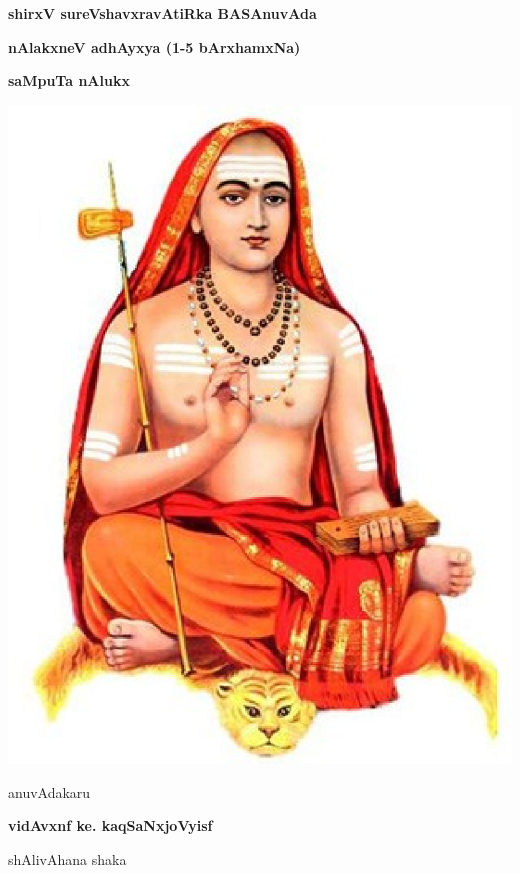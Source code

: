 \thispagestyle{empty}
\begin{center}
{\Huge\bfseries shirxV sureVshavxravAtiRka BASAnuvAda}
\bigskip

{\Large\bfseries nAlakxneV adhAyxya (1-5 bArxhamxNa)}
\bigskip

{\Large\bfseries saMpuTa nAlukx}
\vfill

\includegraphics[scale=0.7]{figures/figure1.eps}

\vfill

anuvAdakaru
\smallskip

{\large\bfseries vidAvxnf ke. kaqSaNxjoVyisf}

\smallskip
shAlivAhana shaka

\end{center}
